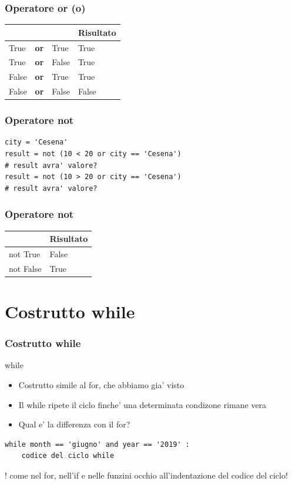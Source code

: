\documentclass{beamer}
\begin{document}
\begin{frame}[fragile]
\frametitle{Operatore or (o)}

\begin{tabu} to 0.8\textwidth { | X[l] | X[c] | X[c] |  X[r] |}
 \hline
  & & & Risultato\\
 \hline
 True & \textbf{or} & True & True\\
 \hline
 True & \textbf{or} & False & True\\
 \hline
 False & \textbf{or} & True & True\\
\hline
 False & \textbf{or} & False& False\\
\hline
\end{tabu}

\end{frame}

\begin{frame}[fragile]
\frametitle{Operatore not}
    \begin{lstlisting}
city = 'Cesena'
result = not (10 < 20 or city == 'Cesena')
# result avra' valore?
result = not (10 > 20 or city == 'Cesena')
# result avra' valore?
    \end{lstlisting}

\end{frame}

\begin{frame}[fragile]
\frametitle{Operatore not}

\begin{tabu} to 0.8\textwidth { | X[c] |  X[c] |}
 \hline
  & Risultato\\
 \hline
 not True & False\\
 \hline
 not False & True\\
\hline
\end{tabu}

\end{frame}

\section{Costrutto while}

\begin{frame}[fragile]
\frametitle{Costrutto while}
\begin{block}{while}
    \begin{itemize}
        \item Costrutto simile al for, che abbiamo gia' visto
        \item Il while ripete il ciclo finche' una determinata condizone rimane vera 
        \item Qual e' la differenza con il for?
    \end{itemize}
\end{block}

    \begin{lstlisting}
while month == 'giugno' and year == '2019' :
    codice del ciclo while
    \end{lstlisting}
    
! come nel for, nell'if e nelle funzini occhio all'indentazione del codice del ciclo!

\end{frame}
\end{document}
